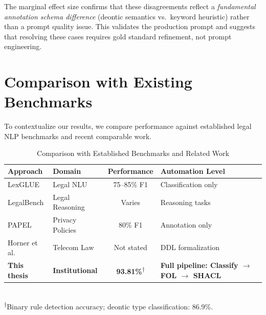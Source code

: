 The marginal effect size confirms that these disagreements reflect a \textit{fundamental annotation schema difference} (deontic semantics vs.\ keyword heuristic) rather than a prompt quality issue. This validates the production prompt and suggests that resolving these cases requires gold standard refinement, not prompt engineering.

\section{Comparison with Existing Benchmarks}

To contextualize our results, we compare performance against established legal NLP benchmarks and recent comparable work.

\begin{table}[htbp]
\centering
\caption{Comparison with Established Benchmarks and Related Work}
\label{tab:benchmark-comparison}
\begin{tabular}{p{4.5cm}p{3cm}cp{3.5cm}}
\toprule
\textbf{Approach} & \textbf{Domain} & \textbf{Performance} & \textbf{Automation Level} \\
\midrule
LexGLUE \citep{chalkidis2022lexglue} & Legal NLU & 75--85\% F1 & Classification only \\
LegalBench \citep{guha2023legalbench} & Legal Reasoning & Varies & Reasoning tasks \\
PAPEL \citep{goknil2024papel} & Privacy Policies & 80\% F1 & Annotation only \\
Horner et al. \citep{horner2025robust} & Telecom Law & Not stated & DDL formalization \\
\midrule
\textbf{This thesis} & \textbf{Institutional} & \textbf{93.81\%}\textsuperscript{$\dagger$} & \textbf{Full pipeline: Classify $\rightarrow$ FOL $\rightarrow$ SHACL} \\
\bottomrule
\end{tabular}
\\[4pt]
\footnotesize\textsuperscript{$\dagger$}Binary rule detection accuracy; deontic type classification: 86.9\%.
\end{table}


